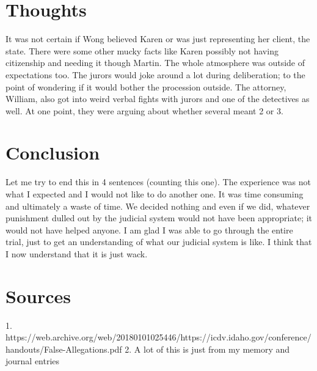 \documentclass{article}
\begin{document}
\section{Thoughts}
It was not certain if Wong believed Karen or was just representing her client, the state. There were some other mucky facts like Karen possibly not having citizenship and needing it though Martin. The whole atmosphere was outside of expectations too. The jurors would joke around a lot during deliberation; to the point of wondering if it would bother the procession outside. The attorney, William, also got into weird verbal fights with jurors and one of the detectives as well. At one point, they were arguing about whether several meant 2 or 3.

\section{Conclusion}
Let me try to end this in 4 sentences (counting this one). The experience was not what I expected and I would not like to do another one. It was time consuming and ultimately a waste of time. We decided nothing and even if we did, whatever punishment dulled out by the judicial system would not have been appropriate; it would not have helped anyone. I am glad I was able to go through the entire trial, just to get an understanding of what our judicial system is like. I think that I now understand that it is just wack.

\section{Sources}
1. https://web.archive.org/web/20180101025446/https://icdv.idaho.gov/conference/handouts/False-Allegations.pdf
2. A lot of this is just from my memory and journal entries
\end{document}
